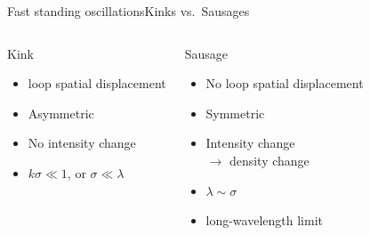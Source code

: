 \documentclass[table]{beamer}
\begin{document}
\begin{frame}{Fast standing oscillations}{Kinks vs.\ Sausages}
    \begin{columns}
    \begin{block}{Kink}
        \begin{itemize}
            \item loop spatial displacement
            \item Asymmetric
            \item No intensity change
            \item $k\sigma \ll 1$, or $\sigma\ll\lambda$
        \end{itemize}
    \end{block}
    \begin{block}{Sausage}
        \begin{itemize}
            \item No loop spatial displacement
            \item Symmetric
            \item Intensity change\\ $\rightarrow$ density change
            \item $\lambda\sim\sigma$
            \item long-wavelength limit
        \end{itemize}
    \end{block}
\end{columns}
\end{frame}%
\end{document}
